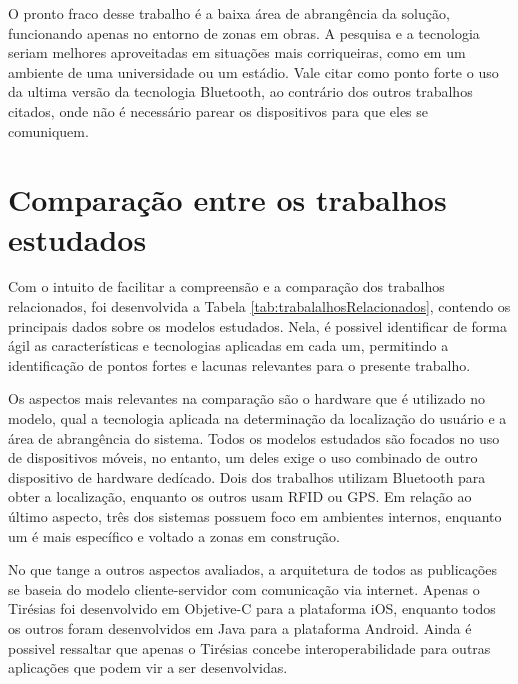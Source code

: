 \documentclass[english,brazilian]{UNISINOSmonografia}
\begin{document}
O pronto fraco desse trabalho é a baixa área de abrangência da solução, funcionando apenas no entorno de zonas em obras.
A pesquisa e a tecnologia seriam melhores aproveitadas em situações mais corriqueiras, como em um ambiente de uma universidade ou um estádio. Vale citar como ponto forte o uso da ultima versão da tecnologia Bluetooth, ao contrário dos outros trabalhos citados, onde não é necessário parear os dispositivos para que eles se comuniquem.

	\section{Comparação entre os trabalhos estudados}\label{comparacaoTrabs}

Com o intuito de facilitar a compreensão e a comparação dos trabalhos relacionados, foi desenvolvida a Tabela \ref{tab:trabalalhosRelacionados}, contendo os principais dados sobre os modelos estudados. Nela, é possivel identificar de forma ágil as características e tecnologias aplicadas em cada um, permitindo a identificação de pontos fortes e lacunas relevantes para o presente trabalho. %

Os aspectos mais relevantes na comparação são o hardware que é utilizado no modelo, qual a tecnologia aplicada na determinação da localização do usuário e a área de abrangência do sistema. Todos os modelos estudados são focados no uso de dispositivos móveis, no entanto, um deles exige o uso combinado de outro dispositivo de hardware dedícado. Dois dos trabalhos utilizam Bluetooth para obter a localização, enquanto os outros usam RFID ou GPS. Em relação ao último aspecto, três dos sistemas possuem foco em ambientes internos, enquanto um é mais específico e voltado a zonas em construção.

No que tange a outros aspectos avaliados, a arquitetura de todos as publicações se baseia do modelo cliente-servidor com comunicação via internet. Apenas o Tirésias foi desenvolvido em Objetive-C para a plataforma iOS, enquanto todos os outros foram desenvolvidos em Java para a plataforma Android. Ainda é possivel ressaltar que apenas o Tirésias concebe interoperabilidade para outras aplicações que podem vir a ser desenvolvidas.

\end{document}
